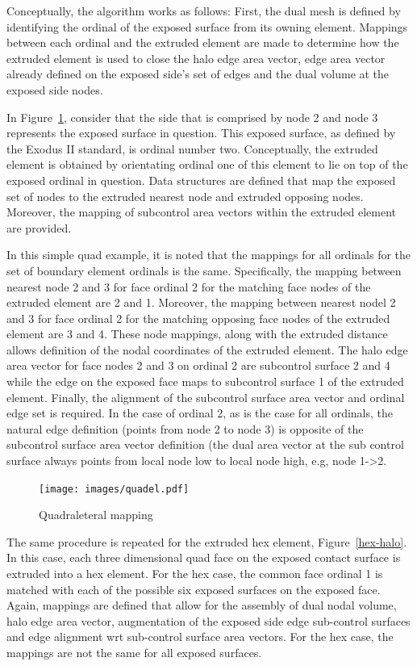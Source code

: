 Conceptually, the algorithm works as follows: First, the dual mesh is defined by identifying
the ordinal of the exposed surface from its owning element. Mappings between each ordinal and the
extruded element are made to determine how the extruded element is used to close the halo edge area vector,
edge area vector already defined on the exposed side's set of edges and the dual volume at the exposed
side nodes.

In Figure~\ref{quad-halo}, consider that the side that is comprised by node 2 and node 3 represents 
the exposed surface in question. This exposed surface, as defined by the Exodus II standard, is ordinal number two. 
Conceptually, the extruded element is obtained by orientating ordinal one of this element to lie on top of the exposed 
ordinal in question. Data structures are defined that map the exposed set of nodes to the extruded 
nearest node and extruded opposing nodes. Moreover, the mapping of subcontrol area vectors within 
the extruded element are provided.  

In this simple quad example, it is noted that the mappings for all
ordinals for the set of boundary element ordinals is the same. Specifically, the mapping between 
nearest node 2 and 3 for face ordinal 2 for the matching face nodes of the extruded element are 2 and 1. Moreover, the mapping 
between nearest nodel 2 and 3 for face ordinal 2 for the matching opposing face nodes of the extruded
element are 3 and 4. These node mappings, along with the extruded distance allows definition of the nodal coordinates
of the extruded element. The halo edge area vector for face nodes 2 and 3 on ordinal 2 are subcontrol surface 2 and 4 
while the edge on the exposed face maps to subcontrol surface 1 of the extruded element. Finally, the
alignment of the subcontrol surface area vector and ordinal edge set is required. In the case of ordinal 2, as is the
case for all ordinals, the natural edge definition (points from node 2 to node 3) is opposite of the subcontrol
surface area vector definition (the dual area vector at the sub control surface always points from local node low to
local node high, e.g, node 1->2.

\begin{figure}[ht]
\centerline{\texttt{[image: images/quadel.pdf]}}
\vspace{0.1in}
\caption{Quadraleteral mapping}
\label{quad-halo}
\end{figure}

The same procedure is repeated for the extruded hex element, Figure~\ref{hex-halo}.
In this case, each three dimensional quad face on the exposed contact surface is extruded
into a hex element. For the hex case, the common face ordinal 1 is matched with each of the possible
six exposed surfaces on the exposed face. Again, mappings are defined that allow for the 
assembly of dual nodal volume, halo edge area vector, augmentation of the exposed side edge
sub-control surfaces and edge alignment wrt sub-control surface area vectors. For the hex case, the mappings are
not the same for all exposed surfaces.

